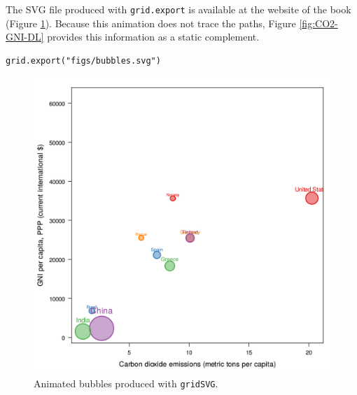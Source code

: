 The SVG file produced with \texttt{grid.export} is available at the website
of the book (Figure \ref{fig:bubblesSVG}). Because this animation does
not trace the paths, Figure \ref{fig:CO2-GNI-DL} provides this
information as a static complement.


\lstset{language=r,label= ,caption= ,captionpos=b,numbers=none}
\begin{lstlisting}
grid.export("figs/bubbles.svg")
\end{lstlisting}

\begin{figure}
  \centering
  \includegraphics[width=\textwidth]{figs/bubbles.png}
  \caption{Animated bubbles produced with \texttt{gridSVG}.}
  \label{fig:bubblesSVG}
\end{figure}
